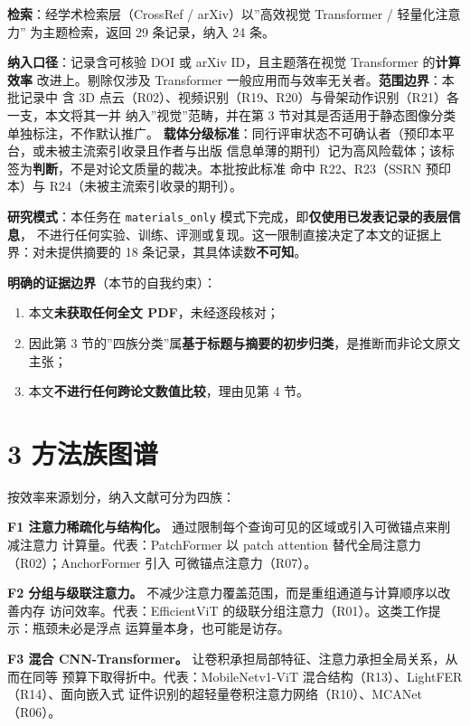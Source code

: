 \documentclass[
  chinese,
]{article}
\providecommand{\tightlist}{%
  \setlength{\itemsep}{0pt}\setlength{\parskip}{0pt}}
\begin{document}
\textbf{检索}：经学术检索层（CrossRef / arXiv）以''高效视觉 Transformer
/ 轻量化注意力'' 为主题检索，返回 29 条记录，纳入 24 条。

\textbf{纳入口径}：记录含可核验 DOI 或 arXiv ID，且主题落在视觉
Transformer 的\textbf{计算效率} 改进上。剔除仅涉及 Transformer
一般应用而与效率无关者。\textbf{范围边界}：本批记录中 含 3D
点云（R02）、视频识别（R19、R20）与骨架动作识别（R21）各一支，本文将其一并
纳入''视觉''范畴，并在第 3
节对其是否适用于静态图像分类单独标注，不作默认推广。
\textbf{载体分级标准}：同行评审状态不可确认者（预印本平台，或未被主流索引收录且作者与出版
信息单薄的期刊）记为高风险载体；该标签为\textbf{判断}，不是对论文质量的裁决。本批按此标准
命中 R22、R23（SSRN 预印本）与 R24（未被主流索引收录的期刊）。

\textbf{研究模式}：本任务在 \texttt{materials\_only}
模式下完成，即\textbf{仅使用已发表记录的表层信息}，
不进行任何实验、训练、评测或复现。这一限制直接决定了本文的证据上界：对未提供摘要的
18 条记录，其具体读数\textbf{不可知}。

\textbf{明确的证据边界}（本节的自我约束）：

\begin{enumerate}
\def\labelenumi{\arabic{enumi}.}
\tightlist
\item
  本文\textbf{未获取任何全文 PDF}，未经逐段核对；
\item
  因此第 3
  节的''四族分类''属\textbf{基于标题与摘要的初步归类}，是推断而非论文原文主张；
\item
  本文\textbf{不进行任何跨论文数值比较}，理由见第 4 节。
\end{enumerate}

\section{3 方法族图谱}\label{ux65b9ux6cd5ux65cfux56feux8c31}

按效率来源划分，纳入文献可分为四族：

\textbf{F1 注意力稀疏化与结构化。}
通过限制每个查询可见的区域或引入可微锚点来削减注意力
计算量。代表：PatchFormer 以 patch attention
替代全局注意力（R02）；AnchorFormer 引入 可微锚点注意力（R07）。

\textbf{F2 分组与级联注意力。}
不减少注意力覆盖范围，而是重组通道与计算顺序以改善内存
访问效率。代表：EfficientViT
的级联分组注意力（R01）。这类工作提示：瓶颈未必是浮点
运算量本身，也可能是访存。

\textbf{F3 混合 CNN-Transformer。}
让卷积承担局部特征、注意力承担全局关系，从而在同等
预算下取得折中。代表：MobileNetv1-ViT
混合结构（R13）、LightFER（R14）、面向嵌入式
证件识别的超轻量卷积注意力网络（R10）、MCANet（R06）。
\end{document}
